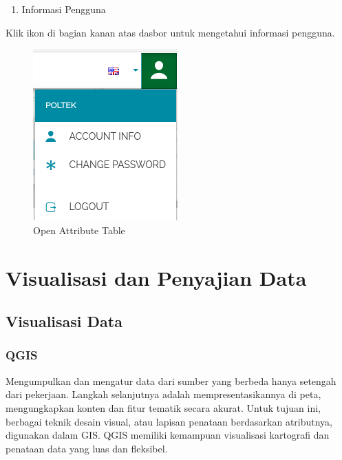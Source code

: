\documentclass[]{book}
\providecommand{\tightlist}{%
  \setlength{\itemsep}{0pt}\setlength{\parskip}{0pt}}
\begin{document}
\begin{enumerate}
\def\labelenumi{\arabic{enumi}.}
\setcounter{enumi}{2}
\tightlist
\item
  Informasi Pengguna
\end{enumerate}

Klik ikon di bagian kanan atas dasbor untuk mengetahui informasi pengguna.

\begin{figure}

{\centering \includegraphics[width=0.5\linewidth]{images/08/ms3} 

}

\caption{Open Attribute Table}\label{fig:fig183}
\end{figure}

\hypertarget{part-visualisasi-dan-penyajian-data}{%
\part{Visualisasi dan Penyajian Data}\label{part-visualisasi-dan-penyajian-data}}

\hypertarget{visualisasi-data}{%
\chapter{Visualisasi Data}\label{visualisasi-data}}

\hypertarget{qgis}{%
\section{QGIS}\label{qgis}}

Mengumpulkan dan mengatur data dari sumber yang berbeda hanya setengah dari pekerjaan. Langkah selanjutnya adalah mempresentasikannya di peta, mengungkapkan konten dan fitur tematik secara akurat. Untuk tujuan ini, berbagai teknik desain visual, atau lapisan penataan berdasarkan atributnya, digunakan dalam GIS. QGIS memiliki kemampuan visualisasi kartografi dan penataan data yang luas dan fleksibel.
\end{document}

